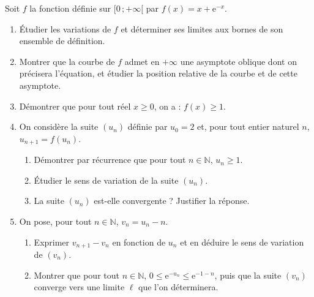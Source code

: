 \documentclass[11pt]{article}
\begin{document}
\begin{exercice}
Soit $f$ la fonction définie sur $[0\,;+\infty[$ par $f(x) = x + \mathrm{e}^{-x}$.
\begin{enumerate}
\item Étudier les variations de $f$ et déterminer ses limites aux bornes de son ensemble de définition.
\item Montrer que la courbe de $f$ admet en $+\infty$ une asymptote oblique dont on précisera l'équation, et étudier la position relative de la courbe et de cette asymptote.
\item Démontrer que pour tout réel $x \geq 0$, on a : $f(x) \geq 1$.
\item On considère la suite $(u_n)$ définie par $u_0 = 2$ et, pour tout entier naturel $n$, $u_{n+1} = f(u_n)$.
\begin{enumerate}
\item Démontrer par récurrence que pour tout $n \in \mathbb{N}$, $u_n \geq 1$.
\item Étudier le sens de variation de la suite $(u_n)$.
\item La suite $(u_n)$ est-elle convergente ? Justifier la réponse.
\end{enumerate}
\item On pose, pour tout $n \in \mathbb{N}$, $v_n = u_n - n$.
\begin{enumerate}
\item Exprimer $v_{n+1} - v_n$ en fonction de $u_n$ et en déduire le sens de variation de $(v_n)$.
\item Montrer que pour tout $n \in \mathbb{N}$, $0 \leq \mathrm{e}^{-u_n} \leq \mathrm{e}^{-1-n}$, puis que la suite $(v_n)$ converge vers une limite $\ell$ que l'on déterminera.
\end{enumerate}
\end{enumerate}
\end{exercice}
\end{document}
